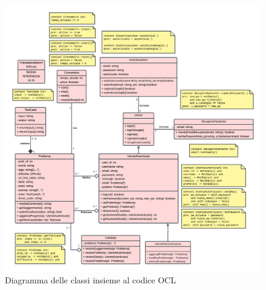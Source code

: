 \documentclass[11pt, a4paper]{article}
\theoremstyle{definition} %
\begin{document}
\begin{figure}[H]
\centering
\hspace*{-2cm}
\includegraphics[scale = 0.54]{materiale/classdiagram.pdf}
\caption{Diagramma delle classi insieme al codice OCL}
\label{umlocl}
\end{figure}
\end{document}
